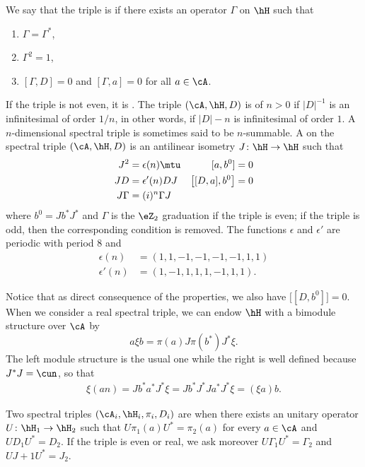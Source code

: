We say that the triple is  if there exists an operator $\Gamma$ on $\hH$ such that
\begin{enumerate}
\item $\Gamma=\Gamma^*$,
\item $\Gamma^2=1$,
\item $[\Gamma,D]=0$ and $[\Gamma,a]=0$ for all $a\in\cA$.
\end{enumerate}
If the triple is not even, it is . The triple $(\cA,\hH,D)$ is of  $n>0$ if $| D |^{-1}$ is an infinitesimal of order $1/n$, in other words, if $| D |-n$ is infinitesimal of order $1$. A $n$-dimensional spectral triple is sometimes said to be $n$-summable. A  on the spectral triple $(\cA,\hH,D)$ is an antilinear isometry $J\colon \hH\to \hH$ such that
\begin{align*}
J^2&=\epsilon(n)\mtu	&[a,b^0]&=0\\
JD&=\epsilon'(n)DJ	&\big[ [D,a],b^0 \big]&=0\\
J\Gamma&=(i)^n\Gamma J
\end{align*}
where $b^0=Jb^*J^*$ and $\Gamma$ is the $\eZ_2$ graduation if the triple is even; if the triple is odd, then the corresponding condition is removed. The functions $\epsilon$ and $\epsilon'$ are periodic with period $8$ and
\[ 
\begin{split}
\epsilon(n)	&=(1,1,-1,-1,-1,-1,1,1)\\
\epsilon'(n)	&=(1,-1,1,1,1,-1,1,1).
\end{split}  
\]

Notice that as direct consequence of the properties, we also have $\big[ [D,b^0] \big]=0$. When we consider a real spectral triple, we can endow $\hH$ with a bimodule structure over $\cA$ by
\[ 
  a\xi b=\pi(a)J\pi(b^*)J^*\xi.
\]
The left module structure is the usual one while the right is well defined because $J^*J=\cun$, so that
\begin{align*}
\xi(an)=Jb^*a^*J^*\xi=Jb^*J^*Ja^*J^*\xi=(\xi a)b.
\end{align*}

Two spectral triples $(\cA_i,\hH_i,\pi_i,D_i)$ are  when there exists an unitary operator $U\colon \hH_1\to \hH_2$ such that $U\pi_1(a)U^*=\pi_2(a)$ for every $a\in\cA$ and $UD_1U^*=D_2$. If the triple is even or real, we ask moreover $U\Gamma_1U^*=\Gamma_2$ and $UJ+1U^*=J_2$.

